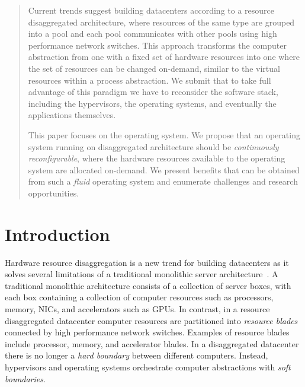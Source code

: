 \maketitle

\begin{abstract}
  Current trends suggest building datacenters according to a resource
disaggregated architecture, where resources of the same type are
grouped into a pool and each pool communicates with other pools
using high performance network switches.  This approach transforms
the computer abstraction from one with a fixed set of hardware
resources into one where the set of resources can be changed
on-demand, similar to the virtual resources within a process
abstraction.  We submit that to take full advantage of this paradigm
we have to reconsider the software stack, including the hypervisors,
the operating systems, and eventually the applications themselves.

This paper focuses on the operating system.  We propose that an
operating system running on disaggregated architecture should be
\emph{continuously reconfigurable}, where the hardware resources
available to the operating system are allocated on-demand.  We
present benefits that can be obtained from such a \emph{fluid}
operating system and enumerate challenges and research opportunities.
 \end{abstract}

\section{Introduction}
\label{sec:intro}
Hardware resource disaggregation is a new trend for building
datacenters as it solves several limitations of a traditional monolithic
server architecture~\cite{Intel_RSA, HP_The_Machine, FB_disaggregated_rack,
chung2018towards, katrinis2016rack, asanovic2014firebox,
lim2009disaggregated, shan2018legoos}. A traditional
monolithic architecture consists of a collection of server boxes, with
each box containing a collection of computer resources such as processors,
memory, NICs, and accelerators such as GPUs.
In contrast, in a resource disaggregated datacenter computer resources
are partitioned into \emph{resource blades} connected by high performance
network switches.
Examples of resource blades include processor, memory, and
accelerator blades.
In a disaggregated datacenter there is no longer a
\emph{hard boundary} between different computers.
Instead, hypervisors and operating systems orchestrate
computer abstractions with \emph{soft boundaries}.

